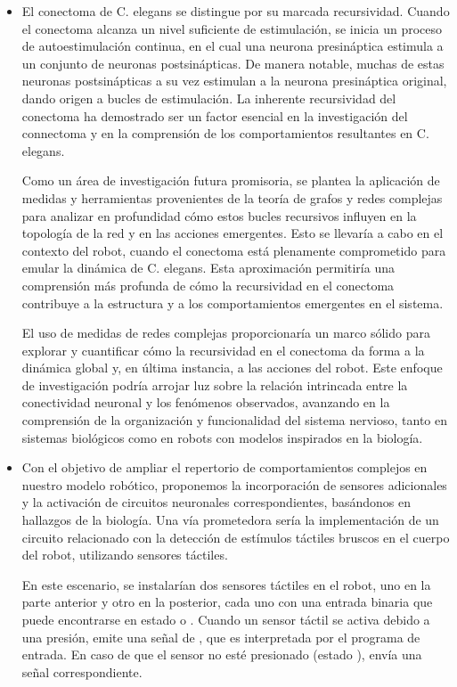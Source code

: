 \begin{itemize}
	
\item El conectoma de C. elegans se distingue por su marcada recursividad. Cuando el conectoma alcanza un nivel suficiente de estimulación, se inicia un proceso de autoestimulación continua, en el cual una neurona presináptica estimula a un conjunto de neuronas postsinápticas. De manera notable, muchas de estas neuronas postsinápticas a su vez estimulan a la neurona presináptica original, dando origen a bucles de estimulación. La inherente recursividad del conectoma ha demostrado ser un factor esencial en la investigación del connectoma y en la comprensión de los comportamientos resultantes en C. elegans.

Como un área de investigación futura promisoria, se plantea la aplicación de medidas y herramientas provenientes de la teoría de grafos y redes complejas para analizar en profundidad cómo estos bucles recursivos influyen en la topología de la red y en las acciones emergentes. Esto se llevaría a cabo en el contexto del robot, cuando el conectoma está plenamente comprometido para emular la dinámica de C. elegans. Esta aproximación permitiría una comprensión más profunda de cómo la recursividad en el conectoma contribuye a la estructura y a los comportamientos emergentes en el sistema.

El uso de medidas de redes complejas proporcionaría un marco sólido para explorar y cuantificar cómo la recursividad en el conectoma da forma a la dinámica global y, en última instancia, a las acciones del robot. Este enfoque de investigación podría arrojar luz sobre la relación intrincada entre la conectividad neuronal y los fenómenos observados, avanzando en la comprensión de la organización y funcionalidad del sistema nervioso, tanto en sistemas biológicos como en robots con modelos inspirados en la biología.
	
	
\item 	Con el objetivo de ampliar el repertorio de comportamientos complejos en nuestro modelo robótico, proponemos la incorporación de sensores adicionales y la activación de circuitos neuronales correspondientes, basándonos en hallazgos de la biología. Una vía prometedora sería la implementación de un circuito relacionado con la detección de estímulos táctiles bruscos en el cuerpo del robot, utilizando sensores táctiles.

En este escenario, se instalarían dos sensores táctiles en el robot, uno en la parte anterior y otro en la posterior, cada uno con una entrada binaria que puede encontrarse en estado  o . Cuando un sensor táctil se activa debido a una presión, emite una señal de , que es interpretada por el programa de entrada. En caso de que el sensor no esté presionado (estado ), envía una señal correspondiente.




\end{itemize}
